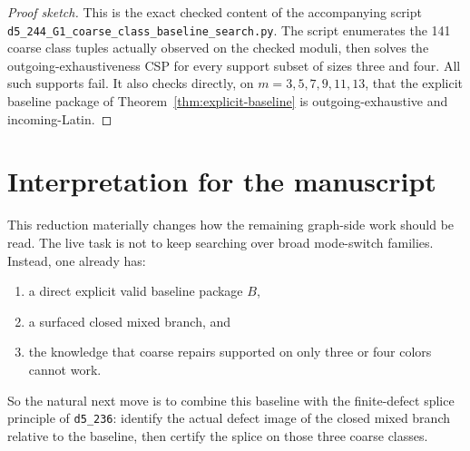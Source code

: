 \documentclass[11pt]{article}
\begin{document}
\begin{proof}[Proof sketch]
This is the exact checked content of the accompanying script
\texttt{d5\_244\_G1\_coarse\_class\_baseline\_search.py}.
The script enumerates the 141 coarse class tuples actually observed on the
checked moduli, then solves the outgoing-exhaustiveness CSP for every support
subset of sizes three and four.
All such supports fail.
It also checks directly, on \(m=3,5,7,9,11,13\), that the explicit baseline
package of Theorem~\ref{thm:explicit-baseline} is outgoing-exhaustive and
incoming-Latin.
\end{proof}

\section{Interpretation for the manuscript}
This reduction materially changes how the remaining graph-side work should be
read.
The live task is not to keep searching over broad mode-switch families.
Instead, one already has:
\begin{enumerate}[label=\textup{(\arabic*)},leftmargin=2.8em]
\item a direct explicit valid baseline package \(B\),
\item a surfaced closed mixed branch, and
\item the knowledge that coarse repairs supported on only three or four colors
      cannot work.
\end{enumerate}
So the natural next move is to combine this baseline with the finite-defect splice
principle of \texttt{d5\_236}: identify the actual defect image of the closed
mixed branch relative to the baseline, then certify the splice on those three
coarse classes.
\end{document}
